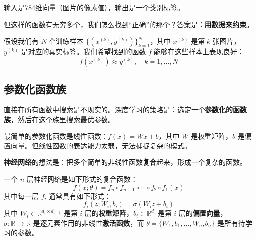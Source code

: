 输入是784维向量（图片的像素值），输出是一个类别标签。

但这样的函数有无穷多个，我们怎么找到``正确''的那个？答案是：\textbf{用数据来约束}。

假设我们有 $N$ 个训练样本 $\{(x^{(k)}, y^{(k)})\}_{k=1}^N$，其中 $x^{(k)}$ 是第 $k$ 张图片，$y^{(k)}$ 是对应的真实标签。我们希望找到的函数 $f$ 能够在这些样本上表现良好：
\begin{equation}
f(x^{(k)}) \approx y^{(k)}, \quad k = 1, \ldots, N
\end{equation}

\subsection{参数化函数族}

直接在所有函数中搜索是不现实的。深度学习的策略是：选定一个\textbf{参数化的函数族}，然后在这个族里搜索最优参数。

最简单的参数化函数是线性函数：$f(x) = Wx + b$，其中 $W$ 是权重矩阵，$b$ 是偏置向量。但线性函数的表达能力太弱，无法捕捉复杂的模式。

\textbf{神经网络}的想法是：把多个简单的非线性函数\textbf{复合}起来，形成一个复杂的函数。

\begin{definition}[神经网络]
一个 $n$ 层神经网络是如下形式的复合函数：
\begin{equation}
f(x; \theta) = f_n \circ f_{n-1} \circ \cdots \circ f_2 \circ f_1(x)
\end{equation}
其中每一层 $f_i$ 通常具有如下形式：
\begin{equation}
f_i(z; W_i, b_i) = \sigma(W_i z + b_i)
\end{equation}
其中 $W_i \in \mathbb{R}^{d_{i} \times d_{i-1}}$ 是第 $i$ 层的\textbf{权重矩阵}，$b_i \in \mathbb{R}^{d_i}$ 是第 $i$ 层的\textbf{偏置向量}，$\sigma: \mathbb{R} \to \mathbb{R}$ 是逐元素作用的非线性\textbf{激活函数}，而 $\theta = \{W_1, b_1, \ldots, W_n, b_n\}$ 是所有待学习的参数。
\end{definition}

